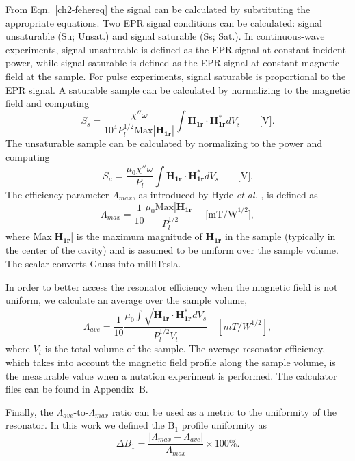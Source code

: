 From Eqn.~\ref{ch2-fehereq} the signal can be calculated by substituting the appropriate equations. Two EPR signal conditions can be calculated: signal unsaturable (Su; Unsat.) and signal saturable (Ss; Sat.). In continuous-wave  experiments, signal unsaturable is defined as the EPR signal at constant incident power, while signal saturable is defined as the EPR signal at constant magnetic field at the sample. For pulse experiments, signal saturable is proportional to the EPR signal. A saturable sample can be calculated by normalizing to the magnetic field and computing
\begin{equation}
    S_s = \frac{\chi'' \omega}{10^4 P_l^{1/2} \text{Max}|\mathbf{H_{1r}}|} \int \mathbf{H_{1r}} \cdot \mathbf{H_{1r}^*} dV_s \qquad \text{[V]}. \label{ch2-eq:ss}
\end{equation}{}
The unsaturable sample can be calculated by normalizing to the power and computing
\begin{equation}
    S_u = \frac{\mu_0 \chi'' \omega}{P_l} \int \mathbf{H_{1r}} \cdot \mathbf{H_{1r}^*} dV_s \qquad  \text{[V]}. \label{ch2-eq:su}
\end{equation}{}
The efficiency parameter $\Lambda_{max}$, as introduced by Hyde {\em et al.} \cite{hydehoff}, is defined as
\begin{equation}
    \Lambda_{max} = \frac{1}{10}\frac{\mu_0 \text{Max}|\mathbf{H_{1r}}|}{P_l^{1/2}} \quad \text{[mT/W}^{1/2}], \label{ch2-eq:lammax}
\end{equation}
where Max$|\mathbf{H_{1r}}|$ is the maximum magnitude of $\mathbf{H_{1r}}$ in the sample (typically in the center of the cavity) and is assumed to be uniform over the sample volume. \cite{hydehoff} The scalar converts Gauss into milliTesla. 

In order to better access the resonator efficiency when the magnetic field is not uniform, we calculate an average over the sample volume, 
\begin{equation}
    \Lambda_{ave} = \frac{1}{10}\frac{\mu_0 \int \sqrt{\mathbf{H_{1r}} \cdot \mathbf{H_{1r}^*}} dV_s}{P_l^{1/2} V_t} \quad [mT/W^{1/2}], \label{ch2-eq:lamave}
\end{equation}
where $V_t$ is the total volume of the sample. The average resonator efficiency, which takes into account the magnetic field profile along the sample volume, is the measurable value when a nutation experiment is performed. The calculator files can be found in Appendix~B.

Finally, the $\Lambda_{ave}$-to-$\Lambda_{max}$ ratio can be used as a metric to the uniformity of the resonator. \cite{UFLGR2017} In this work we defined the B$_1$ profile uniformity as 
\begin{equation}
    \Delta B_1 = \frac{\left| \Lambda_{max} - \Lambda_{ave} \right|}{\Lambda_{max}} \times 100\%.
\end{equation}



{\renewcommand{\bibsection}{\clearpage\section*{\bibname}\markboth{\bibname}{\bibname}}
\renewcommand{\bibname}{CHAPTER 2. REFERENCES}


}


